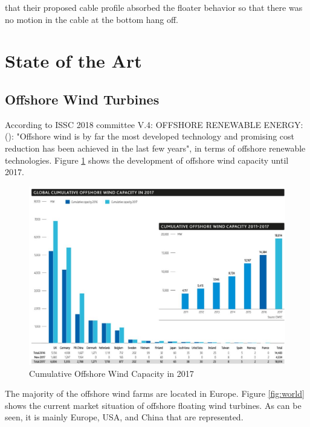 that their proposed cable profile absorbed the floater behavior so that there was no motion in the cable at the bottom hang off.  

\section{State of the Art}
\subsection{Offshore Wind Turbines}
According to ISSC 2018 committee V.4: OFFSHORE RENEWABLE ENERGY: (\cite{Gao2018}): "Offshore wind is by far the most developed technology and
promising cost reduction has been achieved in the last few years", in terms of offshore renewable technologies. Figure \ref{fig:sit17} shows the development of offshore wind capacity until 2017. 

\begin{figure}[H]
\centering
\includegraphics[scale=0.8]{figures/sit17}
\caption[$\; \:$Cumulative Offshore Wind Capacity in 2017]{Cumulative Offshore Wind Capacity in 2017 \cite{GWEC2018}}
 \label{fig:sit17}
\end{figure}

\noindent The majority of the offshore wind farms are located in Europe. Figure \ref{fig:world} shows the current market situation of offshore floating wind turbines. As can be seen, it is mainly Europe, USA, and China that are represented. 


